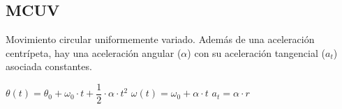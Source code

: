 \subsection{MCUV}

Movimiento circular uniformemente variado. Además de una aceleración centrípeta, hay una aceleración angular ($\alpha$) con su aceleración tangencial ($a_t$) asociada constantes.

\hfil
$\theta(t) = \theta_0 + \omega_0 \cdot t + \dfrac{1}{2} \cdot \alpha \cdot t^2$
\hfil
$\omega(t) = \omega_0 + \alpha \cdot t$
\hfil
$a_t = \alpha \cdot r$
\hfil
